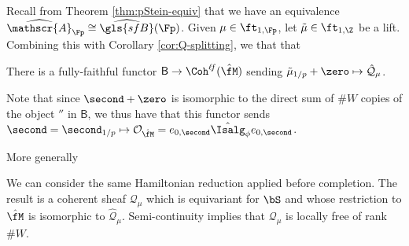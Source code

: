 Recall from Theorem \ref{thm:pStein-equiv} that we have an equivalence $\widehat{\mathscr{A}}_{\Fp}\cong \widehat{\gls{sfB}}(\Fp)$. Given $\mu\in \ft_{1,\Fp}$, let $\tilde{\mu}\in \ft_{1,\Z}$ be a lift. Combining this with Corollary \ref{cor:Q-splitting}, we that that
\begin{lemma}\label{lem:Gamma-iso}
There is a fully-faithful functor $\mathsf{B}\to  \Coh^{\ell \!f}(\hat{\fM})$ sending $ \tilde{\mu}_{1/p}+\zero\mapsto \mathcal{\hat Q}_\mu$.  \end{lemma}
Note that since $\second+\zero$ is isomorphic to the direct sum of $\# W$ copies of the object $\second$ in $\mathsf{B}$, we thus have that this functor sends $\second=\second_{1/p}\mapsto \mathcal{O}_{\hat{\fM}}=e_{0,\second}\hat{\Isalg}_\phi e_{0,\second}$.  


More generally

We can consider the same Hamiltonian reduction applied before completion.  The result is a coherent sheaf ${\mathcal{Q}}_\mu$ which is equivariant for $\bS$ and whose restriction to $\hat{\fM}$ is isomorphic to $\hat{\mathcal{Q}}_\mu$.  Semi-continuity implies that ${\mathcal{Q}}_\mu$ is locally free of rank $\#W$.

